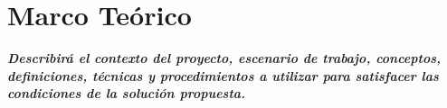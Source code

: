 \chapter{Marco Teórico}\label{ch:ThesisMarcTeo}

\textbf{\textit{Describirá el contexto del proyecto, escenario de trabajo, conceptos, definiciones, técnicas y procedimientos a utilizar para satisfacer las condiciones de la solución propuesta.}}

